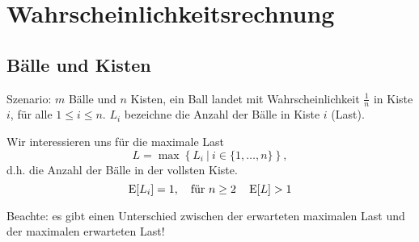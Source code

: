 \section{Wahrscheinlichkeitsrechnung}
\subsection{Bälle und Kisten}
Szenario: $m$ Bälle und $n$ Kisten, ein Ball landet mit Wahrscheinlichkeit
$\frac{1}{n}$ in Kiste $i$, für alle $1\leq i\leq n$. $L_i$ bezeichne die
Anzahl der Bälle in Kiste $i$ (Last).

Wir interessieren uns für die maximale Last
\[
  L = \max\left\{ L_i\ |\ i \in \{1,\dots,n\}\right\},
\]
d.h. die Anzahl der Bälle in der vollsten Kiste.
\[
  \operatorname{E}[L_i] = 1, \quad \text{für } n \geq 2 \quad \operatorname{E}[L] > 1
\]

Beachte: es gibt einen Unterschied zwischen der erwarteten maximalen Last und
der maximalen erwarteten Last!

